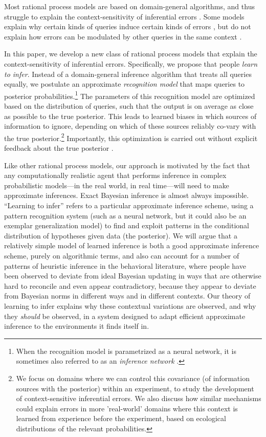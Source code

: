 Most rational process models are based on domain-general algorithms, and thus struggle to explain the context-sensitivity of inferential errors \citep[see][for a similar argument]{mercier2017enigma}. Some models explain why certain kinds of queries induce certain kinds of errors \citep{dasgupta2017hypotheses}, but do not explain how errors can be modulated by other queries in the same context \citep{gershman2014amortized,dasgupta2018remembrance}.

In this paper, we develop a new class of rational process models that explain the context-sensitivity of inferential errors. Specifically, we propose that people \emph{learn to infer}. Instead of a domain-general inference algorithm that treats all queries equally, we postulate an approximate \emph{recognition model} \citep{dayan1995helmholtz,kingma2014auto} that maps queries to posterior probabilities.\footnote{When the recognition model is parametrized as a neural network, it is sometimes also referred to as an \emph{inference network} \citep{mnih2014neural,rezende2015variational,paige2016inference}.} The parameters of this recognition model are optimized based on the distribution of queries, such that the output is on average as close as possible to the true posterior. This leads to learned biases in which sources of information to ignore, depending on which of these sources reliably co-vary with the true posterior.\footnote{We focus on domains where we can control this covariance (of information sources with the posterior) within an experiment, to study the development of context-sensitive inferential errors. We also discuss how similar mechanisms could explain errors in more 'real-world' domains where this context is learned from experience before the experiment, based on ecological distributions of the relevant probabilities.} Importantly, this optimization is carried out without explicit feedback about the true posterior \citep{mnih2014neural}.

Like other rational process models, our approach is motivated by the fact that any computationally realistic agent that performs inference in complex probabilistic models---in the real world, in real time---will need to make approximate inferences. Exact Bayesian inference is almost always impossible. ``Learning to infer'' refers to a particular approximate inference scheme, using a pattern recognition system (such as a neural network, but it could also be an exemplar generalization model) to find and exploit patterns in the conditional distribution of hypotheses given data (the posterior). We will argue that a relatively simple model of learned inference is both a good approximate inference scheme, purely on algorithmic terms, and also can account for a number of patterns of heuristic inference in the behavioral literature, where people have been observed to deviate from ideal Bayesian updating in ways that are otherwise hard to reconcile and even appear contradictory, because they appear to deviate from Bayesian norms in different ways and in different contexts. Our theory of learning to infer explains why these contextual variations are observed, and why they \emph{should} be observed, in a system designed to adapt efficient approximate inference to the environments it finds itself in. 

